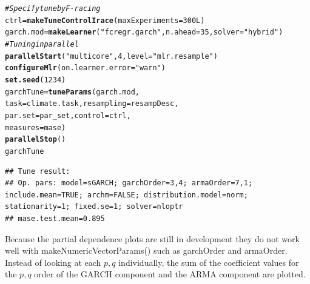 \documentclass[12pt]{article}\usepackage[]{graphicx}\usepackage[]{color}
\makeatletter
\newcommand{\hlnum}[1]{\textcolor[rgb]{0.686,0.059,0.569}{#1}}%
\newcommand{\hlstr}[1]{\textcolor[rgb]{0.192,0.494,0.8}{#1}}%
\newcommand{\hlcom}[1]{\textcolor[rgb]{0.678,0.584,0.686}{\textit{#1}}}%
\newcommand{\hlstd}[1]{\textcolor[rgb]{0.345,0.345,0.345}{#1}}%
\newcommand{\hlkwb}[1]{\textcolor[rgb]{0.69,0.353,0.396}{#1}}%
\newcommand{\hlkwc}[1]{\textcolor[rgb]{0.333,0.667,0.333}{#1}}%
\newcommand{\hlkwd}[1]{\textcolor[rgb]{0.737,0.353,0.396}{\textbf{#1}}}%
\newenvironment{kframe}{%
 \def\at@end@of@kframe{}%
 \ifinner\ifhmode%
  \def\at@end@of@kframe{\end{minipage}}%
  \begin{minipage}{\columnwidth}%
 \fi\fi%
 \def\FrameCommand##1{\hskip\@totalleftmargin \hskip-\fboxsep
 \colorbox{shadecolor}{##1}\hskip-\fboxsep
     \hskip-\linewidth \hskip-\@totalleftmargin \hskip\columnwidth}%
 \MakeFramed {\advance\hsize-\width
   \@totalleftmargin\z@ \linewidth\hsize
   \@setminipage}}%
 {\par\unskip\endMakeFramed%
 \at@end@of@kframe}
\newenvironment{knitrout}{}{} %
\theoremstyle{definition}
\newcommand\code{\@codex}
\def\@codex#1{{\normalfont\ttfamily\hyphenchar\font=-1 #1}}
\makeatother
\begin{document}
\begin{knitrout}
\begin{kframe}
\begin{alltt}
\hlcom{#Specify tune by F-racing}
\hlstd{ctrl} \hlkwb{=} \hlkwd{makeTuneControlIrace}\hlstd{(}\hlkwc{maxExperiments} \hlstd{=} \hlnum{300L}\hlstd{)}
\hlstd{garch.mod} \hlkwb{=} \hlkwd{makeLearner}\hlstd{(}\hlstr{"fcregr.garch"}\hlstd{,} \hlkwc{n.ahead}\hlstd{=} \hlnum{35}\hlstd{,} \hlkwc{solver} \hlstd{=} \hlstr{"hybrid"}\hlstd{)}
\hlcom{#Tuning in parallel}
\hlkwd{parallelStart}\hlstd{(}\hlstr{"multicore"}\hlstd{,}\hlnum{4}\hlstd{,} \hlkwc{level} \hlstd{=} \hlstr{"mlr.resample"}\hlstd{)}
\hlkwd{configureMlr}\hlstd{(}\hlkwc{on.learner.error} \hlstd{=} \hlstr{"warn"}\hlstd{)}
\hlkwd{set.seed}\hlstd{(}\hlnum{1234}\hlstd{)}
\hlstd{garchTune} \hlkwb{=} \hlkwd{tuneParams}\hlstd{(garch.mod,}
                    \hlkwc{task} \hlstd{= climate.task,} \hlkwc{resampling} \hlstd{= resampDesc,}
                    \hlkwc{par.set} \hlstd{= par_set,} \hlkwc{control} \hlstd{= ctrl,}
                    \hlkwc{measures} \hlstd{= mase)}
\hlkwd{parallelStop}\hlstd{()}
\hlstd{garchTune}
\end{alltt}
\end{kframe}
\end{knitrout}
\doublespacing



\begin{knitrout}
\color{fgcolor}\begin{kframe}
\begin{verbatim}
## Tune result:
## Op. pars: model=sGARCH; garchOrder=3,4; armaOrder=7,1; include.mean=TRUE; archm=FALSE; distribution.model=norm; stationarity=1; fixed.se=1; solver=nloptr
## mase.test.mean=0.895
\end{verbatim}
\end{kframe}
\end{knitrout}


Because the partial dependence plots are still in development they do not work well with \code{makeNumericVectorParams()} such as \code{garchOrder} and \code{armaOrder}. Instead of looking at each $p,q$ individually, the sum of the coefficient values for the $p,q$ order of the GARCH component and the ARMA component are plotted.

\singlespacing
\end{document}
